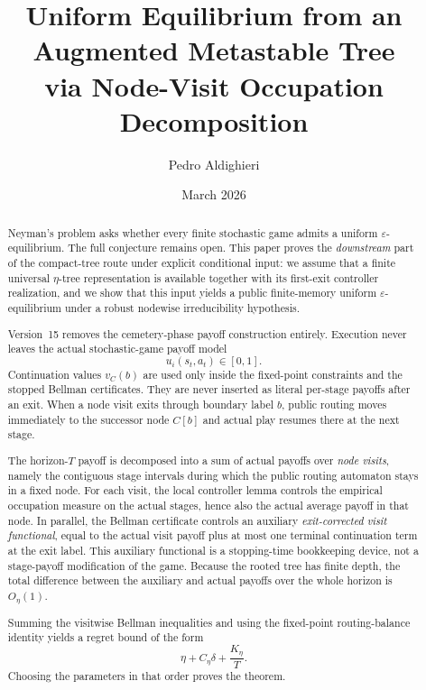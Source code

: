 \documentclass[12pt]{article}
\title{\textbf{Uniform Equilibrium from an Augmented Metastable Tree\\via Node-Visit Occupation Decomposition}}
\author{Pedro Aldighieri}
\date{March 2026}
\theoremstyle{definition}
\newcommand{\eps}{\varepsilon}
\newcommand{\1}{\mathbf{1}}
\begin{document}
\maketitle




\begin{abstract}
Neyman's problem asks whether every finite stochastic game admits a uniform
$\eps$-equilibrium. The full conjecture remains open. This paper proves the
\emph{downstream} part of the compact-tree route under explicit conditional input:
we assume that a finite universal $\eta$-tree representation is available
together with its first-exit controller realization, and we show that this input
yields a public finite-memory uniform $\eps$-equilibrium under a robust
nodewise irreducibility hypothesis.

Version~15 removes the cemetery-phase payoff construction entirely. Execution
never leaves the actual stochastic-game payoff model
\[
u_i(s_t,a_t)\in[0,1].
\]
Continuation values $v_C(b)$ are used only inside the fixed-point constraints and
the stopped Bellman certificates. They are never inserted as literal per-stage
payoffs after an exit. When a node visit exits through boundary label $b$, public
routing moves immediately to the successor node $C[b]$ and actual play resumes
there at the next stage.

The horizon-$T$ payoff is decomposed into a sum of actual payoffs over
\emph{node visits}, namely the contiguous stage intervals during which the public
routing automaton stays in a fixed node. For each visit, the local controller
lemma controls the empirical occupation measure on the actual stages, hence also
the actual average payoff in that node. In parallel, the Bellman certificate
controls an auxiliary \emph{exit-corrected visit functional}, equal to the actual
visit payoff plus at most one terminal continuation term at the exit label. This
auxiliary functional is a stopping-time bookkeeping device, not a stage-payoff
modification of the game. Because the rooted tree has finite depth, the total
difference between the auxiliary and actual payoffs over the whole horizon is
$O_\eta(1)$.

Summing the visitwise Bellman inequalities and using the fixed-point
routing-balance identity yields a regret bound of the form
\[
\eta + C_\eta\delta + \frac{K_\eta}{T}.
\]
Choosing the parameters in that order proves the theorem.
\end{abstract}
\end{document}
